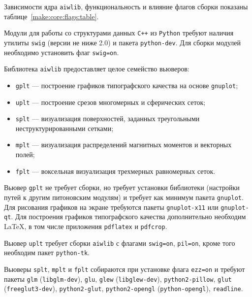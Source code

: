 Зависимости ядра \verb'aiwlib', функциональность и влияние флагов сборки показаны  таблице~\ref{make:core:flags:table}.

Модули для работы со структурами данных \verb'C++' из \verb'Python'
требуют наличия утилиты \verb'swig' (версии не ниже 2.0) и пакета
\verb'python-dev'. Для сборки модулей необходимо установить флаг \verb'swig=on'.

Библиотека \verb'aiwlib' предоставляет целое семейство вьюверов:
\begin{itemize}
  \item \verb'gplt' --- построение графиков типографского качества на
    основе {\tt gnuplot};
  \item \verb'uplt' ---  построение срезов многомерных и
    сферических сеток;
  \item\verb'splt' --- визуализация поверхностей, заданных треугольными неструктурированными сетками;
  \item\verb'mplt' --- визуализация распределений магнитных моментов
    и векторных полей;
  \item\verb'fplt' --- воксельная визуализация трехмерных равномерных
    сеток.
\end{itemize}

Вьювер \verb'gplt' не требует сборки, но требует установки библиотеки (настройки
путей к другим питоновским модулям) и требует как минимум пакета
\verb'gnuplot'.
Для рисования графиков на экране требуются пакеты \verb'gnuplot-x11'
или \verb'gnuplot-qt'. Для построения графиков типографского качества
дополнительно необходим \LaTeX, в том числе приложения \verb'pdflatex'
и \verb'pdfcrop'.

Вьювер \verb'uplt' требует сборки \verb'aiwlib' с флагами
\verb'swig=on', \verb'pil=on', кроме того необходим пакет
\verb'python-tk'.

Вьюверы \verb'splt', \verb'mplt' и \verb'fplt' собираются при
установке флага \verb'ezz=on' и требуют пакеты
\verb'glm' (\verb'libglm-dev'), \verb'glu', \verb'glew' (\verb'libglew-dev'), \verb'python2-pillow', \verb'glut' (\verb'freeglut3-dev'),
\verb'python2-glut', \verb'python2-opengl' (\verb'python-opengl'), \verb'readline'.


